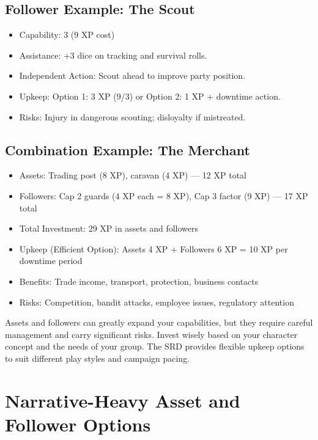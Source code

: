 \documentclass[11pt,twoside,openany]{book}
\begin{document}
\subsection*{Follower Example: The Scout}

\begin{itemize}
\item Capability: 3 (9 XP cost)
\item Assistance: +3 dice on tracking and survival rolls.
\item Independent Action: Scout ahead to improve party position.
\item Upkeep: Option 1: 3 XP (9/3) or Option 2: 1 XP + downtime action.
\item Risks: Injury in dangerous scouting; disloyalty if mistreated.
\end{itemize}

\subsection*{Combination Example: The Merchant}

\begin{itemize}
\item Assets: Trading post (8 XP), caravan (4 XP) --- 12 XP total
\item Followers: Cap 2 guards (4 XP each = 8 XP), Cap 3 factor (9 XP) --- 17 XP total
\item Total Investment: 29 XP in assets and followers
\item Upkeep (Efficient Option): Assets 4 XP + Followers 6 XP = 10 XP per downtime period
\item Benefits: Trade income, transport, protection, business contacts
\item Risks: Competition, bandit attacks, employee issues, regulatory attention
\end{itemize}

\begin{tcolorbox}[colback=gray!5!white, colframe=gray!75!black, title=Remember, fonttitle=\bfseries,breakable]
Assets and followers can greatly expand your capabilities, but they require careful management and carry significant risks. Invest wisely based on your character concept and the needs of your group. The SRD provides flexible upkeep options to suit different play styles and campaign pacing.
\end{tcolorbox}

\section*{Narrative-Heavy Asset and Follower Options} 
\end{document}
